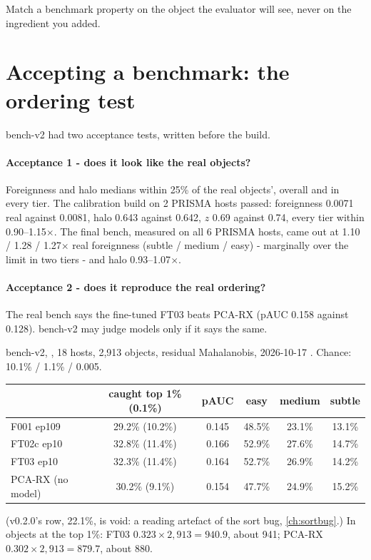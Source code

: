 \begin{keypoint}
Match a benchmark property on the object the evaluator will see, never on the ingredient you added.
\end{keypoint}

\section{Accepting a benchmark: the ordering test}\label{sec:benchmarks:accept}

bench-v2 had two acceptance tests, written before the build.

\paragraph{Acceptance 1 - does it look like the real objects?} Foreignness and halo medians within 25\% of the real
objects', overall and in every tier. The calibration build on 2 PRISMA hosts passed: foreignness 0.0071 real against
0.0081, halo 0.643 against 0.642, $z$ 0.69 against 0.74, every tier within 0.90--1.15$\times$\hfil{}\hfilneg{}.
The final bench, measured on all 6 PRISMA hosts, came out at 1.10 / 1.28 / 1.27$\times$ real foreignness (subtle /
medium / easy) - marginally over the limit in two tiers - and halo 0.93--1.07$\times$.

\paragraph{Acceptance 2 - does it reproduce the real ordering?} The real bench says the fine-tuned FT03 beats PCA-RX
(pAUC 0.158 against 0.128). bench-v2 may judge models only if it says the same.

\begin{drift}
bench-v2, , 18 hosts, 2,913 objects, residual Mahalanobis, 2026-10-17
\hfil{}\hfilneg{}. Chance: 10.1\% / 1.1\% / 0.005.

\begin{center}
\small
\begin{tabular}{lccccc}
\toprule
 & caught top 1\% (0.1\%) & pAUC & easy & medium & subtle \\
\midrule
F001 ep109 & 29.2\% (10.2\%) & 0.145 & 48.5\% & 23.1\% & 13.1\% \\
FT02c ep10 & 32.8\% (11.4\%) & 0.166 & 52.9\% & 27.6\% & 14.7\% \\
FT03 ep10 & 32.3\% (11.4\%) & 0.164 & 52.7\% & 26.9\% & 14.2\% \\
PCA-RX (no model) & 30.2\% (9.1\%) & 0.154 & 47.7\% & 24.9\% & 15.2\% \\
\bottomrule
\end{tabular}
\end{center}
(v0.2.0's row, 22.1\%, is void: a reading artefact of the sort bug, \cref{ch:sortbug}.) In objects at the top 1\%:
FT03 $0.323 \times 2{,}913 = 940.9$, about 941; PCA-RX $0.302 \times 2{,}913 = 879.7$, about 880.
\end{drift}

